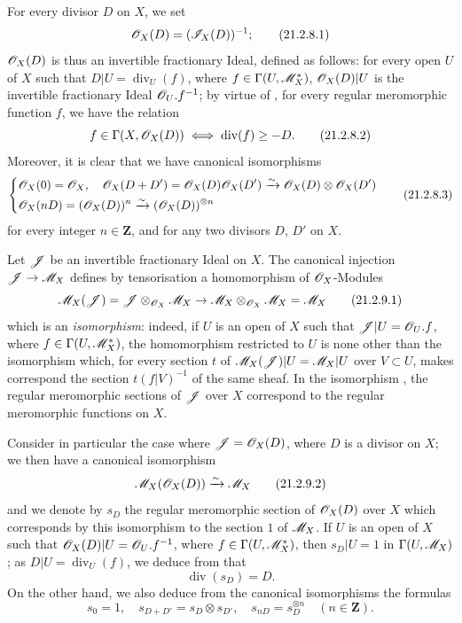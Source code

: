 \begin{env}[21.2.8]
\label{IV.21.2.8}
For every divisor $D$ on $X$, we set
\[
\label{IV.21.2.8.1}
  \mathscr{O}_X(D)=(\mathscr{I}_X(D))^{-1};
  \tag{21.2.8.1}
\]
$\mathscr{O}_X(D)$ is thus an invertible fractionary Ideal, defined as follows:
for every open $U$ of $X$ such that $D|U=\operatorname{div}_U(f)$, where $f\in\Gamma(U,\mathscr{M}_X^*)$, $\mathscr{O}_X(D)|U$ is the invertible fractionary Ideal
$\mathscr{O}_U.f^{-1}$;
by virtue of , for every regular meromorphic function $f$, we have the relation
\[
\label{IV.21.2.8.2}
  f\in\Gamma(X,\mathscr{O}_X(D)) \iff \operatorname{div}(f)\geq -D.
  \tag{21.2.8.2}
\]
Moreover, it is clear that we have canonical isomorphisms 
\[
\label{IV.21.2.8.3}
  \left\{\begin{aligned}
    &\mathscr{O}_X(0)=\mathscr{O}_X,\quad \mathscr{O}_X(D+D')=\mathscr{O}_X(D)\mathscr{O}_X(D')\xrightarrow{\sim}\mathscr{O}_X(D)\otimes\mathscr{O}_X(D')\\
    &\mathscr{O}_X(nD)=(\mathscr{O}_X(D))^n\xrightarrow{\sim}(\mathscr{O}_X(D))^{\otimes n}
  \end{aligned}\right.
  \tag{21.2.8.3}
\]
for every integer $n\in\mathbf{Z}$, and for any two divisors $D$, $D'$ on $X$.
\end{env}

\begin{env}[21.2.9]
\label{IV.21.2.9}
Let $\mathscr{J}$ be an invertible fractionary Ideal on $X$.
The canonical injection $\mathscr{J}\to\mathscr{M}_X$ defines by tensorisation a homomorphism of $\mathscr{O}_X$-Modules
\[
\label{IV.21.2.9.1}
  \mathscr{M}_X(\mathscr{J})=\mathscr{J}\otimes_{\mathscr{O}_X}\mathscr{M}_X\to\mathscr{M}_X\otimes_{\mathscr{O}_X}\mathscr{M}_X=\mathscr{M}_X
  \tag{21.2.9.1}
\]
which is an \emph{isomorphism}:
indeed, if $U$ is an open of $X$ such that $\mathscr{J}|U=\mathscr{O}_U.f$, where $f\in\Gamma(U,\mathscr{M}_X^*)$, the homomorphism  restricted to $U$ is none other than the isomorphism which, for every section $t$ of $\mathscr{M}_X(\mathscr{J})|U=\mathscr{M}_X|U$ over $V\subset U$, makes correspond the section $t(f|V)^{-1}$ of the same sheaf.
In the isomorphism , the regular meromorphic sections of $\mathscr{J}$ over $X$ correspond to the regular meromorphic functions on $X$.

Consider in particular the case where $\mathscr{J}=\mathscr{O}_X(D)$, where $D$ is a divisor on $X$;
we then have a canonical isomorphism
\[
\label{IV.21.2.9.2}
  \mathscr{M}_X(\mathscr{O}_X(D))\xrightarrow{\sim}\mathscr{M}_X
  \tag{21.2.9.2}
\]
and we denote by $s_D$ the regular meromorphic section of $\mathscr{O}_X(D)$ over $X$ which corresponds by this isomorphism to the section $1$ of $\mathscr{M}_X$.
If $U$ is an open of $X$ such that $\mathscr{O}_X(D)|U=\mathscr{O}_U.f^{-1}$, where $f\in\Gamma(U,\mathscr{M}_X^*)$, then $s_D|U=1$ in $\Gamma(U,\mathscr{M}_X)$;
as $D|U=\operatorname{div}_U(f)$, we deduce from  that
\[
\label{IV.21.2.9.3}
  \operatorname{div}(s_D)=D.
  \tag{21.2.9.3}
\]
On the other hand, we also deduce from the canonical isomorphisms  the formulas
\[
\label{IV.21.2.9.4}
  s_0=1,\quad s_{D+D'}=s_D\otimes s_{D'},\quad s_{nD}=s_D^{\otimes n}\quad (n\in\mathbf{Z}).
  \tag{21.2.9.4}
\]
\end{env}

